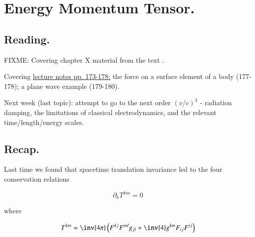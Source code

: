 %
%

\chapter{Energy Momentum Tensor.}
\label{chap:relativisticElectrodynamicsL23}
{}
\date{Mar 29, 2011}

\beginArtNoToc

\section{Reading.}

FIXME:
Covering chapter X material from the text \cite{landau1980classical}.

Covering \href{http://www.physics.utoronto.ca/~poppitz/epoppitz/PHY450_files/RelEMpp166-180.pdf}{lecture notes pp. 173-178:} the force on a surface element of a body (177-178); a plane wave example (179-180).

Next week (last topic): attempt to go to the next order $(v/c)^3$ - radiation damping, the limitations of classical electrodynamics, and the relevant time/length/energy scales.

\section{Recap.}

Last time we found that spacetime translation invariance led to the four conservation relations

\begin{equation}\label{eqn:relativisticElectrodynamicsL23:10}
\partial_k T^{k m} = 0
\end{equation}

where

\begin{equation}\label{eqn:relativisticElectrodynamicsL23:30}
T^{k m} = \inv{4 \pi} \left( F^{k j} F^{m l} g_{j l} + \inv{4} g^{k m} F_{i j} F^{i j} \right)
\end{equation}

